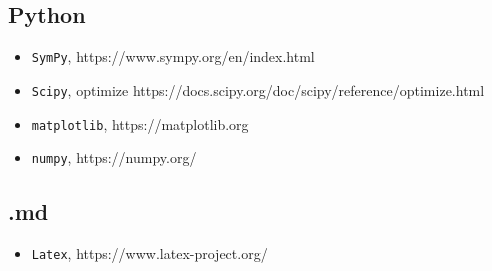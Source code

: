 \documentclass[11pt]{article}
\providecommand{\tightlist}{%
      \setlength{\itemsep}{0pt}\setlength{\parskip}{0pt}}
\begin{document}
\subsection{Python}\label{python}

\begin{itemize}
\tightlist
\item
  \texttt{SymPy}, https://www.sympy.org/en/index.html
\item
  \texttt{Scipy}, optimize
  https://docs.scipy.org/doc/scipy/reference/optimize.html
\item
  \texttt{matplotlib}, https://matplotlib.org
\item
  \texttt{numpy}, https://numpy.org/
\end{itemize}

\subsection{.md}\label{md}

\begin{itemize}
\tightlist
\item
  \texttt{Latex}, https://www.latex-project.org/
\end{itemize}


    
    
    
\end{document}
